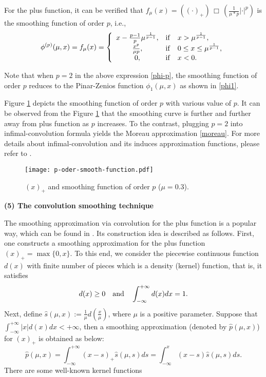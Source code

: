 \documentclass[12pt]{article}
\begin{document}
 \noindent
 For the plus function, it can be verified that
 $f_\mu (x)=((\cdot)_+) \, \Box \, \left( \frac{1}{\mu *p}|\cdot|^p \right)$ is the
 smoothing function of order $p$, i.e.,
 \begin{equation}\label{phi-p}
 \phi^{(p)} (\mu, x)= f_\mu (x) = \left\{
 \begin{array}{cll}
 x-\frac{p-1}{p}\mu^{\frac{1}{p-1}}, & {\rm if} & x > \mu^{\frac{1}{p-1}}, \\
 \frac{x^p}{\mu p},                & {\rm if} & 0 \leq x \leq  \mu^{\frac{1}{p-1}},\\
  0,                                 & {\rm if} & x<0.
 \end{array}
 \right.
 \end{equation}

 Note that when $p = 2$ in the above expression \eqref{phi-p}, the smoothing function
 of order $p$ reduces to the Pinar-Zenios function $\phi_1(\mu, x)$ as shown in \eqref{phi1}.

 Figure \ref{p-order-smoothr} depicts the smoothing function of order $p$ with various value
 of $p$. It can be observed from the Figure \ref{p-order-smoothr} that the smoothing curve is
 further and further away from plus function as $p$ increases.
 To the contrast, plugging $p = 2$ into infimal-convolution formula
 yields the Moreau approximation \eqref{moreau}. For more details
 about infimal-convolution and its induces approximation functions, please refer to
 \cite{BM12, BC2016}.



 \begin{figure}
 \centering
 \texttt{[image: p-oder-smooth-function.pdf]}\\
 \caption{ $(x)_+$ and smoothing function of order $p$ ($\mu=0.3$).}\label{p-order-smoothr}
 \end{figure}



 \noindent
 {\bf (5) The convolution smoothing technique}

 \medskip

 The smoothing approximation via convolution for the plus function
 is a popular way, which can be found in \cite{CM96, KR92, QD02, VOY15}. Its
 construction idea is described as follows. First, one constructs a smoothing
 approximation for the plus function $(x)_+ = \max\{0,x\}$. To this end, we
 consider the piecewise continuous function $d(x)$ with finite number of pieces
 which is a density (kernel) function, that is, it satisfies
 \[
 d(x)\geq 0 \quad {\rm and} \quad \int_{-\infty}^{+\infty}d(x)dx = 1.
 \]
 Next, define $\hat{s}(\mu, x) := \frac{1}{\mu}d\left(\frac{x}{\mu}\right)$,
 where $\mu$ is a positive parameter. Suppose that
 $\int_{-\infty}^{+\infty}\left|x\right|d(x)dx < +\infty$, then a smoothing
 approximation (denoted by $\hat{p}(\mu, x)$) for $(x)_+$ is obtained as below:
 \begin{equation*}
 \hat{p}(\mu, x) = \int_{-\infty}^{+\infty}(x-s)_+\hat{s}(\mu, s)ds
 = \int_{-\infty}^{x}(x-s)\hat{s}(\mu, s)ds.
 \end{equation*}
 There are some well-known kernel functions
\end{document}
